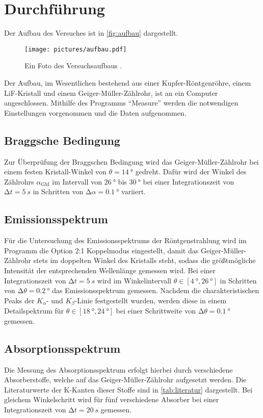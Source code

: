 \section{Durchführung}
\label{sec:Durchführung}

Der Aufbau des Versuches ist in \autoref{fig:aufbau} dargestellt.
\begin{figure}
    \centering
    \texttt{[image: pictures/aufbau.pdf]}
    \caption{Ein Foto des Versuchsaufbaus \cite{v602}.}
    \label{fig:aufbau}
\end{figure}
Der Aufbau, im Wesentlichen bestehend aus einer Kupfer-Röntgenröhre, 
einem LiF-Kristall und einem Geiger-Müller-Zählrohr, ist an ein Computer angeschlossen.
Mithilfe des Programms \enquote{Measure} werden die notwendigen Einstellungen vorgenommen
und die Daten aufgenommen.


\subsection{Braggsche Bedingung}

Zur Überprüfung der Braggschen Bedingung wird das Geiger-Müller-Zählrohr
bei einem festen Kristall-Winkel von $\theta = \qty{14}{°}$ gedreht.
Dafür wird der Winkel des Zählrohrs $\alpha_\text{GM}$ im Intervall von $\qty{26}{°}$ bis $\qty{30}{°}$ bei einer Integrationszeit von 
$\increment t = \qty{5}{s}$ in Schritten von $\increment \alpha = \qty{0.1}{°}$ variiert. 


\subsection{Emissionsspektrum}

Für die Untersuchung des Emissionsspektrums der Röntgenstrahlung wird im Programm
die Option 2:1 Koppelmodus eingestellt, 
damit das Geiger-Müller-Zählrohr stets im doppelten Winkel des Kristalls steht,
sodass die größtmögliche Intensität der entsprechenden Wellenlänge gemessen wird.
Bei einer Integrationszeit von $\increment t = \qty{5}{s}$ wird im Winkelintervall 
$\theta \in [\qty{4}{°}, \qty{26}{°}]$ in Schritten von $\increment \theta = \qty{0.2}{°}$
das Emissionsspektrum gemessen.
Nachdem die charakteristischen Peaks der $K_\alpha$- und $K_\beta$-Linie festgestellt wurden,
werden diese in einem Detailspektrum für $\theta \in [\qty{18}{°}, \qty{24}{°}]$ bei einer Schrittweite von $\increment \theta = \qty{0.1}{°}$ gemessen.


\subsection{Absorptionsspektrum}

Die Messung des Absorptionsspektrum erfolgt hierbei durch verschiedene Absorberstoffe, 
welche auf das Geiger-Müller-Zählrohr aufgesetzt werden.
Die Literaturwerte der K-Kanten dieser Stoffe sind in \autoref{tab:literatur} dargestellt.
Bei gleichem Winkelschritt wird für fünf verschiedene Absorber bei einer Integrationszeit von $\increment t = \qty{20}{s}$ gemessen.